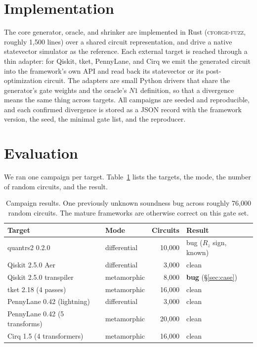 \documentclass[11pt]{article}
\newcommand{\tool}{\textsc{cforge-fuzz}}
\begin{document}
\section{Implementation}

The core generator, oracle, and shrinker are implemented in Rust
(\tool{}, roughly 1{,}500 lines) over a shared circuit representation, and
drive a native statevector simulator as the reference. Each external
target is reached through a thin adapter: for Qiskit, tket, PennyLane,
and Cirq we emit the generated circuit into the framework's own API and
read back its statevector or its post-optimization circuit. The adapters
are small Python drivers that share the generator's gate weights and the
oracle's $N1$ definition, so that a divergence means the same thing
across targets. All campaigns are seeded and reproducible, and each
confirmed divergence is stored as a JSON record with the framework
version, the seed, the minimal gate list, and the reproducer.

\section{Evaluation}

We ran one campaign per target. Table~\ref{tab:campaigns} lists the
targets, the mode, the number of random circuits, and the result.

\begin{table}[h]
\centering
\small
\begin{tabular}{llrl}
\toprule
Target & Mode & Circuits & Result \\
\midrule
quantrs2 0.2.0 & differential & 10{,}000 & bug ($R_z$ sign, known) \\
Qiskit 2.5.0 Aer & differential & 3{,}000 & clean \\
Qiskit 2.5.0 transpiler & metamorphic & 8{,}000 & \textbf{bug} (\S\ref{sec:case}) \\
tket 2.18 (4 passes) & metamorphic & 16{,}000 & clean \\
PennyLane 0.42 (lightning) & differential & 3{,}000 & clean \\
PennyLane 0.42 (5 transforms) & metamorphic & 20{,}000 & clean \\
Cirq 1.5 (4 transformers) & metamorphic & 16{,}000 & clean \\
\bottomrule
\end{tabular}
\caption{Campaign results. One previously unknown soundness bug across
roughly 76{,}000 random circuits. The mature frameworks are otherwise
correct on this gate set.}
\label{tab:campaigns}
\end{table}
\end{document}
